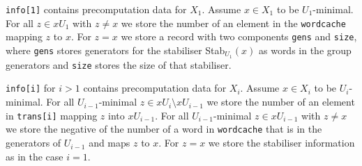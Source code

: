 \documentclass[a4paper,11pt]{report}
\begin{document}
{{{\begin{description}
 \texttt{info[1]} contains precomputation data for $X_1$. Assume $x \in X_1$ to be $U_1$-minimal. For all $z \in xU_1$ with $z \neq x$ we store the number of an element in the \texttt{wordcache} mapping $z$ to $x$. For $z=x$ we store a record with two components \texttt{gens} and \texttt{size}, where \texttt{gens} stores generators for the stabiliser Stab$_{{U_1}}(x)$ as words in the group generators and \texttt{size} stores the size of that stabiliser. 

 \texttt{info[i]} for $i>1$ contains precomputation data for $X_i$. Assume $x \in X_i$ to be $U_i$-minimal. For all $U_{{i-1}}$-minimal $z \in xU_i \setminus xU_{{i-1}}$ we store the number of an element in \texttt{trans[i]} mapping $z$ into $xU_{{i-1}}$. For all $U_{{i-1}}$-minimal $z \in xU_{{i-1}}$ with $z \neq x$ we store the negative of the number of a word in \texttt{wordcache} that is in the generators of $U_{{i-1}}$ and maps $z$ to $x$. For $z=x$ we store the stabiliser information as in the case $i=1$. 


\end{description}}}}
\end{document}
